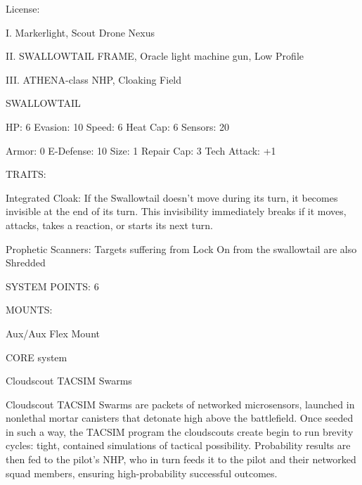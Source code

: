                                                      License:
 

                                                                                                                


I. Markerlight, Scout Drone Nexus
 
II. SWALLOWTAIL FRAME,  Oracle light machine gun, Low Profile
 
III. ATHENA-class NHP, Cloaking Field
 

                                                SWALLOWTAIL 

  HP: 6           Evasion: 10                            Speed: 6            Heat Cap: 6         Sensors: 20 

  Armor: 0        E-Defense: 10                          Size: 1             Repair Cap: 3       Tech Attack:  
                                                                                                 +1 

                                                      TRAITS: 

  Integrated Cloak: If the Swallowtail doesn’t move during its turn, it becomes invisible at the end of its  
  turn. This invisibility immediately breaks if it moves, attacks, takes a reaction, or starts its next turn.
 
  Prophetic Scanners: Targets suffering from Lock On from the swallowtail are also Shredded 

                                               SYSTEM POINTS: 6 

                                                     MOUNTS: 

  Aux/Aux                                                 Flex Mount 

                                                   CORE system 

                                          Cloudscout TACSIM Swarms  

  Cloudscout TACSIM Swarms are packets of networked microsensors, launched in nonlethal mortar  
  canisters that detonate high above the battlefield. Once seeded in such a way, the TACSIM program the  
  cloudscouts create begin to run brevity cycles: tight, contained simulations of tactical possibility.  
  Probability results are then fed to the pilot’s NHP, who in turn feeds it to the pilot and their networked  
  squad members, ensuring high-probability successful outcomes.       

